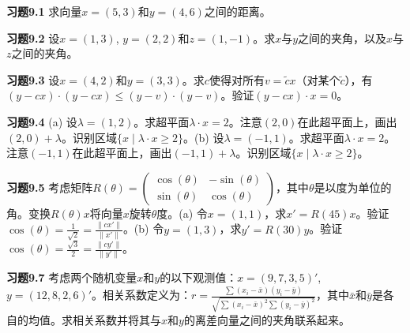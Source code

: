 \begin{translation}
\textbf{习题9.1} 求向量$x = (5,3)$和$y = (4,6)$之间的距离。

\textbf{习题9.2} 设$x = (1,3)$, $y = (2,2)$和$z = (1,-1)$。求$x$与$y$之间的夹角，以及$x$与$z$之间的夹角。

\textbf{习题9.3} 设$x = (4,2)$和$y = (3,3)$。求$c$使得对所有$v = \tilde{c} x$（对某个$\tilde{c}$），有$(y - c x) \cdot (y - c x) \le (y - v) \cdot (y - v)$。验证$(y - c x) \cdot x = 0$。

\textbf{习题9.4} (a) 设$\lambda = (1,2)$。求超平面$\lambda \cdot x = 2$。注意$(2,0)$在此超平面上，画出$(2,0) + \lambda$。识别区域$\{x \mid \lambda \cdot x \ge 2\}$。(b) 设$\lambda = (-1,1)$。求超平面$\lambda \cdot x = 2$。注意$(-1,1)$在此超平面上，画出$(-1,1) + \lambda$。识别区域$\{x \mid \lambda \cdot x \ge 2\}$。

\textbf{习题9.5} 考虑矩阵$R(\theta) = \begin{pmatrix} \cos(\theta) & -\sin(\theta) \\ \sin(\theta) & \cos(\theta) \end{pmatrix}$，其中$\theta$是以度为单位的角。变换$R(\theta)x$将向量$x$旋转$\theta$度。(a) 令$x = (1,1)$，求$x' = R(45)x$。验证$\cos(\theta) = \frac{1}{\sqrt{2}} = \frac{\|c x'\|}{\|x'\|}$。(b) 令$y = (1,3)$，求$y' = R(30)y$。验证$\cos(\theta) = \frac{\sqrt{3}}{2} = \frac{\|c y'\|}{\|y'\|}$。

\textbf{习题9.7} 考虑两个随机变量$x$和$y$的以下观测值：$x = (9, 7, 3, 5)'$, $y = (12, 8, 2, 6)'$。相关系数定义为：$r = \frac{\sum (x_i - \bar{x})(y_i - \bar{y})}{\sqrt{\sum (x_i - \bar{x})^2 \sum (y_i - \bar{y})^2}}$，其中$\bar{x}$和$\bar{y}$是各自的均值。求相关系数并将其与$x$和$y$的离差向量之间的夹角联系起来。
\end{translation}
